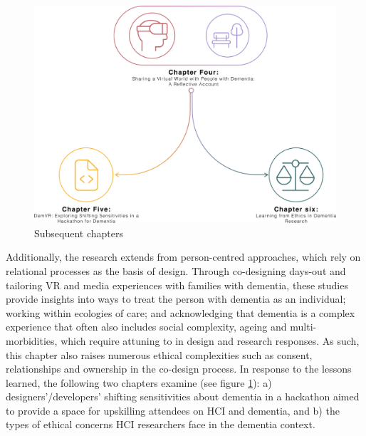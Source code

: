 \begin{figure}[htp]
\centering
\includegraphics[width=0.6\linewidth]{Images/Thesis_Narrative/Narrative_ChapterFour.png}
\caption{Subsequent chapters}
\label{fig:ChapterFour_FutureStudies}
\end{figure}

Additionally, the research extends from person-centred approaches, which rely on relational processes as the basis of design. Through co-designing days-out and tailoring VR and media experiences with families with dementia, these studies provide insights into ways to treat the person with dementia as an individual; working within ecologies of care; and acknowledging that dementia is a complex experience that often also includes social complexity, ageing and multi-morbidities, which require attuning to in design and research responses. As such, this chapter also raises numerous ethical complexities such as consent, relationships and ownership in the co-design process. In response to the lessons learned, the following two chapters examine (see figure \ref{fig:ChapterFour_FutureStudies}): a) designers'/developers' shifting sensitivities about dementia in a hackathon aimed to provide a space for upskilling attendees on HCI and dementia, and b) the types of ethical concerns HCI researchers face in the dementia context.






